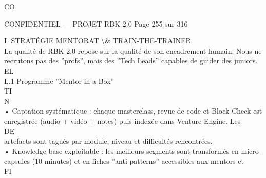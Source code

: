 CO\\
\vspace{0.5em}
\vspace{0.5em}
\vspace{0.5em}
\vspace{0.5em}
\begin{confidential}CONFIDENTIEL — PROJET RBK 2.0                                            Page 255 sur 316\end{confidential}
L \textbar{} STRATÉGIE MENTORAT \textbackslash{}& TRAIN-THE-TRAINER\\
\vspace{0.5em}
\vspace{0.5em}
La qualité de RBK 2.0 repose sur la qualité de son encadrement humain. Nous ne recrutons pas des ”profs”, mais des ”Tech Leads” capables de guider des juniors.\\
\vspace{0.5em}
\vspace{0.5em}
\vspace{0.5em}
\vspace{0.5em}
EL\\
L.1 Programme ”Mentor-in-a-Box”\\
\vspace{0.5em}
\vspace{0.5em}
\vspace{0.5em}
\vspace{0.5em}
TI\\
N\\
• Captation systématique : chaque masterclass, revue de code et Block Check est enregistrée (audio + vidéo + notes) puis indexée dans Venture Engine. Les\\
\vspace{0.5em}
\vspace{0.5em}
\vspace{0.5em}
\vspace{0.5em}
DE\\
artefacts sont tagués par module, niveau et difficultés rencontrées.\\
\vspace{0.5em}
• Knowledge base exploitable : les meilleurs segments sont transformés en micro-capsules (10 minutes) et en fiches ”anti-patterns” accessibles aux mentors et\\
\vspace{0.5em}
\vspace{0.5em}
\vspace{0.5em}
\vspace{0.5em}
FI\\
